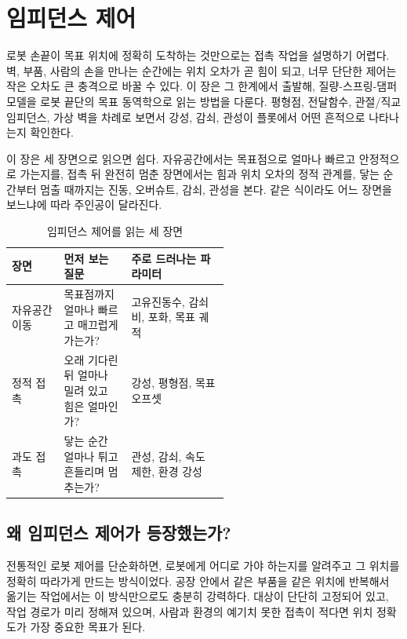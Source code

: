 \section{임피던스 제어}

로봇 손끝이 목표 위치에 정확히 도착하는 것만으로는 접촉 작업을 설명하기 어렵다.
벽, 부품, 사람의 손을 만나는 순간에는 위치 오차가 곧 힘이 되고, 너무 단단한 제어는 작은 오차도 큰 충격으로 바꿀 수 있다.
이 장은 그 한계에서 출발해, 질량-스프링-댐퍼 모델을 로봇 끝단의 목표 동역학으로 읽는 방법을 다룬다.
평형점, 전달함수, 관절/직교 임피던스, 가상 벽을 차례로 보면서 강성, 감쇠, 관성이 플롯에서 어떤 흔적으로 나타나는지 확인한다.

이 장은 세 장면으로 읽으면 쉽다.
자유공간에서는 목표점으로 얼마나 빠르고 안정적으로 가는지를, 접촉 뒤 완전히 멈춘 장면에서는 힘과 위치 오차의 정적 관계를, 닿는 순간부터 멈출 때까지는 진동, 오버슈트, 감쇠, 관성을 본다.
같은 식이라도 어느 장면을 보느냐에 따라 주인공이 달라진다.

\begin{table}[!htbp]
  \centering
  \caption{임피던스 제어를 읽는 세 장면}
  \small
  \setlength{\tabcolsep}{4pt}
  \begin{tabularx}{\linewidth}{@{}>{\raggedright\arraybackslash}p{0.24\linewidth}>{\raggedright\arraybackslash}p{0.31\linewidth}>{\raggedright\arraybackslash}X@{}}
    \toprule
    장면 & 먼저 보는 질문 & 주로 드러나는 파라미터 \\
    \midrule
    자유공간 이동 & 목표점까지 얼마나 빠르고 매끄럽게 가는가? & 고유진동수, 감쇠비, 포화, 목표 궤적 \\
    정적 접촉 & 오래 기다린 뒤 얼마나 밀려 있고 힘은 얼마인가? & 강성, 평형점, 목표 오프셋 \\
    과도 접촉 & 닿는 순간 얼마나 튀고 흔들리며 멈추는가? & 관성, 감쇠, 속도 제한, 환경 강성 \\
    \bottomrule
  \end{tabularx}
\end{table}

\subsection{왜 임피던스 제어가 등장했는가?}

전통적인 로봇 제어를 단순화하면, 로봇에게 어디로 가야 하는지를 알려주고 그 위치를 정확히 따라가게 만드는 방식이었다.
공장 안에서 같은 부품을 같은 위치에 반복해서 옮기는 작업에서는 이 방식만으로도 충분히 강력하다.
대상이 단단히 고정되어 있고, 작업 경로가 미리 정해져 있으며, 사람과 환경의 예기치 못한 접촉이 적다면 위치 정확도가 가장 중요한 목표가 된다.

